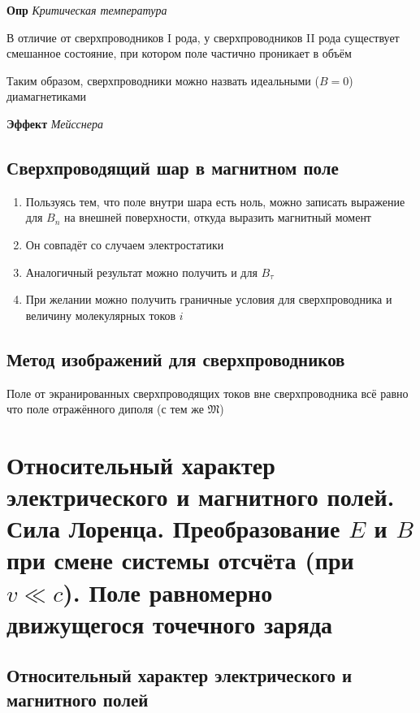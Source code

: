 \documentclass[a4paper, 14pt]{article}
\begin{document}
    \textbf{Опр} \textit{Критическая температура}
    
    В отличие от сверхпроводников I рода, у сверхпроводников II рода существует смешанное состояние, при котором поле
    частично проникает в объём
    
    Таким образом, сверхпроводники можно назвать идеальными ($B = 0$) диамагнетиками
    
    \textbf{Эффект} \textit{Мейсснера}
    
    \subsection{Сверхпроводящий шар в магнитном поле}
    
    \begin{enumerate}
        \item Пользуясь тем, что поле внутри шара есть ноль, можно записать выражение для $B_n$ на внешней
        поверхности, откуда выразить магнитный момент
        \item Он совпадёт со случаем электростатики
        \item Аналогичный результат можно получить и для $B_\tau$
        \item При желании можно получить граничные условия для сверхпроводника и величину молекулярных токов $i$
    \end{enumerate}
    
    \subsection{Метод изображений для сверхпроводников}
    
    Поле от экранированных сверхпроводящих токов вне сверхпроводника всё равно что поле отражённого диполя (с тем же
    $\mathfrak{M}$)
    
    \section{Относительный характер электрического и магнитного полей.
    Сила Лоренца.
    Преобразование $E$ и $B$ при смене системы отсчёта (при $v \ll c$).
    Поле равномерно движущегося точечного заряда}
    
    \subsection{Относительный характер электрического и магнитного полей}
    
\end{document}
